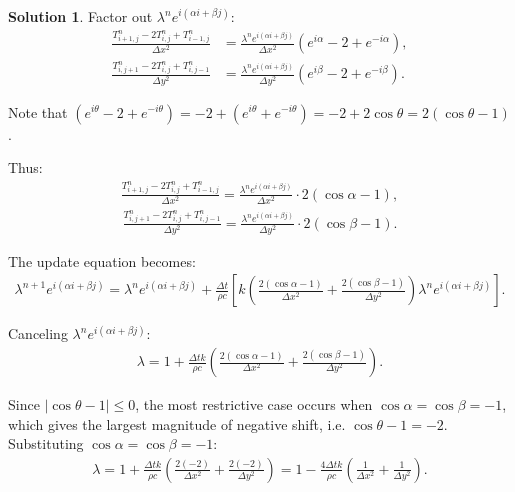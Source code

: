 \documentclass[12pt]{article}
\theoremstyle{definition} %
\newtheorem{solution}{Solution}
\theoremstyle{plain} %
\begin{document}
\begin{solution}
\noindent Factor out $\lambda^n e^{i(\alpha i + \beta j)}$:
\begin{align}
\frac{T_{i+1,j}^n - 2T_{i,j}^n + T_{i-1,j}^n}{\Delta x^2} &= \frac{\lambda^n e^{i(\alpha i + \beta j)}}{\Delta x^2} (e^{i\alpha} - 2 + e^{-i\alpha}), \\
\frac{T_{i,j+1}^n - 2T_{i,j}^n + T_{i,j-1}^n}{\Delta y^2} &= \frac{\lambda^n e^{i(\alpha i + \beta j)}}{\Delta y^2} (e^{i\beta} - 2 + e^{-i\beta}).
\end{align}

\noindent Note that $(e^{i\theta} - 2 + e^{-i\theta}) = -2 + (e^{i\theta} + e^{-i\theta}) = -2 + 2\cos\theta = 2(\cos\theta - 1)$.

\noindent Thus:
\begin{align}
\frac{T_{i+1,j}^n - 2T_{i,j}^n + T_{i-1,j}^n}{\Delta x^2} = \frac{\lambda^n e^{i(\alpha i + \beta j)}}{\Delta x^2} \cdot 2(\cos\alpha - 1),
\end{align}
\begin{align}
\frac{T_{i,j+1}^n - 2T_{i,j}^n + T_{i,j-1}^n}{\Delta y^2} = \frac{\lambda^n e^{i(\alpha i + \beta j)}}{\Delta y^2} \cdot 2(\cos\beta - 1).
\end{align}

\noindent The update equation becomes:
\begin{align}
\lambda^{n+1} e^{i(\alpha i + \beta j)} = \lambda^n e^{i(\alpha i + \beta j)} + \frac{\Delta t}{\rho c} \left[ k \left( \frac{2(\cos\alpha - 1)}{\Delta x^2} + \frac{2(\cos\beta - 1)}{\Delta y^2} \right)\lambda^n e^{i(\alpha i + \beta j)} \right].
\end{align}

\noindent Canceling $\lambda^n e^{i(\alpha i + \beta j)}$:
\begin{align}
\lambda = 1 + \frac{\Delta t k}{\rho c}\left( \frac{2(\cos\alpha - 1)}{\Delta x^2} + \frac{2(\cos\beta - 1)}{\Delta y^2}\right).
\end{align}

\noindent Since $|\cos\theta - 1| \leq 0$, the most restrictive case occurs when $\cos\alpha = \cos\beta = -1$, which gives the largest magnitude of negative shift, i.e. $\cos\theta - 1 = -2$. Substituting $\cos\alpha = \cos\beta = -1$:
\begin{align}
\lambda = 1 + \frac{\Delta t k}{\rho c}\left(\frac{2(-2)}{\Delta x^2} + \frac{2(-2)}{\Delta y^2}\right) = 1 - \frac{4\Delta t k}{\rho c}\left( \frac{1}{\Delta x^2} + \frac{1}{\Delta y^2}\right).
\end{align}


\end{solution}
\end{document}

